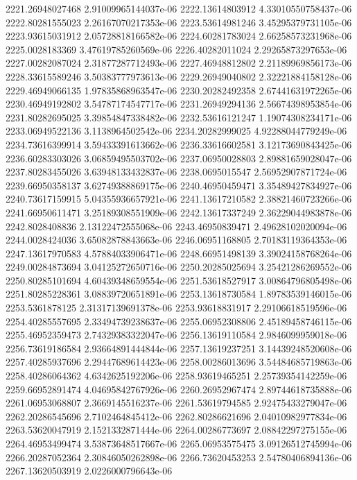 {2221.26948027468 2.91009965144037e-06
2222.13614803912 4.33010550758437e-06
2222.80281555023 2.26167070217353e-06
2223.53614981246 3.45295379731105e-06
2223.93615031912 2.05728818166582e-06
2224.60281783024 2.66258573231968e-06
2225.0028183369 3.47619785260569e-06
2226.40282011024 2.29265873297653e-06
2227.00282087024 2.31877287712493e-06
2227.46948812802 2.21189969856173e-06
2228.33615589246 3.50383777973613e-06
2229.26949040802 2.32221884158128e-06
2229.46949066135 1.97835868963547e-06
2230.20282492358 2.67441631972265e-06
2230.46949192802 3.54787174547717e-06
2231.26949294136 2.56674398953854e-06
2231.80282695025 3.39854847338482e-06
2232.53616121247 1.19074308234171e-06
2233.06949522136 3.1138964502542e-06
2234.20282999025 4.92288044779249e-06
2234.73616399914 3.59433391613662e-06
2236.33616602581 3.12173690843425e-06
2236.60283303026 3.06859495503702e-06
2237.06950028803 2.89881659028047e-06
2237.80283455026 3.63948133432837e-06
2238.0695015547 2.56952907871724e-06
2239.66950358137 3.62749388869175e-06
2240.46950459471 3.35489427834927e-06
2240.73617159915 5.04355936657921e-06
2241.13617210582 2.38821460723266e-06
2241.66950611471 3.25189308551909e-06
2242.13617337249 2.36229044983878e-06
2242.8028408836 2.13122472555068e-06
2243.46950839471 2.49628102020094e-06
2244.0028424036 3.65082878843663e-06
2246.06951168805 2.70183119364353e-06
2247.13617970583 4.57884033906471e-06
2248.66951498139 3.39024158768264e-06
2249.00284873694 3.04125272650716e-06
2250.20285025694 3.25421286269552e-06
2250.80285101694 4.60439348659554e-06
2251.53618527917 3.00864796805498e-06
2251.80285228361 3.08839720651891e-06
2253.13618730584 1.89783539146015e-06
2253.5361878125 2.31317139691378e-06
2253.93618831917 2.29106618519596e-06
2254.40285557695 2.33494739238637e-06
2255.06952308806 2.45189458746115e-06
2255.46952359473 2.74329383322047e-06
2256.13619110584 2.9846099959018e-06
2256.73619186584 2.93664891444844e-06
2257.13619237251 3.14439248520608e-06
2257.40285937696 2.29447689614423e-06
2258.00286013696 3.54484685719863e-06
2258.40286064362 4.6342625192206e-06
2258.93619465251 2.25739354142259e-06
2259.66952891474 4.04695842767926e-06
2260.26952967474 2.89744618735888e-06
2261.06953068807 2.3669145516237e-06
2261.53619794585 2.92475433279047e-06
2262.20286545696 2.7102464845412e-06
2262.80286621696 2.04010982977834e-06
2263.53620047919 2.1521332871444e-06
2264.00286773697 2.08842297275155e-06
2264.46953499474 3.53873648517667e-06
2265.06953575475 3.09126512745994e-06
2266.20287052364 2.30846050262898e-06
2266.73620453253 2.54780406894136e-06
2267.13620503919 2.0226000796643e-06
}

